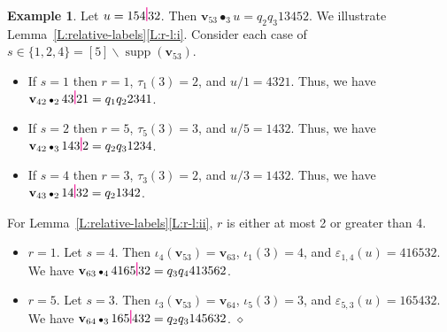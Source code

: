 \documentclass[12pt,oneside,reqno]{amsart}
\theoremstyle{definition}
\newtheorem{example}[theorem]{Example}
\numberwithin{equation}{section}
\newcommand{\qv}{{\mathbf v}}
\newcommand{\ptsp}{\hspace{0.55pt}}
\newcommand{\pb}{\raisebox{-1pt}{\ptsp\color{magenta}\rule{0.75pt}{11pt}}\ptsp}  %
\DeclareMathOperator{\supp}{supp}
\DeclareMathOperator{\kactionop}{{\scriptstyle \bullet}}
\begin{document}
\begin{example}\label{Ex:three_cases}
  Let $u=154\pb32$.
  Then $\qv_{53}\kactionop_3 u = q_2q_3 13452$.
  We illustrate Lemma~\ref{L:relative-labels}\ref{L:r-l:i}.
  Consider each case of $s\in\{1,2,4\}=[5]\smallsetminus\supp(\qv_{53})$.
  \begin{itemize}
%
    \item  If $s=1$ then $r=1$, $\tau_1(3)=2$, and $u/1=4321$.
     Thus, we have $\qv_{42}\kactionop_2 43\pb 21= q_1q_2 2341$.
    \item  If $s=2$  then $r=5$, $\tau_5(3)=3$, and $u/5=1432$.
     Thus, we have $\qv_{42}\kactionop_3 143\pb 2= q_2 q_3 1234$.
    \item  If  $s=4$  then $r=3$, $\tau_3(3)=2$, and $u/3=1432$.
     Thus, we have $\qv_{43}\kactionop_2 14\pb32= q_2 1342$.
  \end{itemize}

   For Lemma~\ref{L:relative-labels}\ref{L:r-l:ii}, $r$ is either at most 2 or greater than 4.
  \begin{itemize}
%
     \item $r=1$.  Let $s=4$.  Then $\iota_4(\qv_{53})=\qv_{63}$, $\iota_1(3)=4$, and $\varepsilon_{1,4}(u)=416532$.
   We have $\qv_{63}\kactionop_4 4165\pb 32=q_3q_4 413562$.
%
    \item   $r=5$.  Let $s=3$.  Then $\iota_3(\qv_{53})=\qv_{64}$, $\iota_5(3)=3$, and $\varepsilon_{5,3}(u)=165432$.
   We have $\qv_{64}\kactionop_3 165\pb 432=q_2q_3 145632$. 
   \hfill$\diamond$
  \end{itemize}
\end{example}
\end{document}
